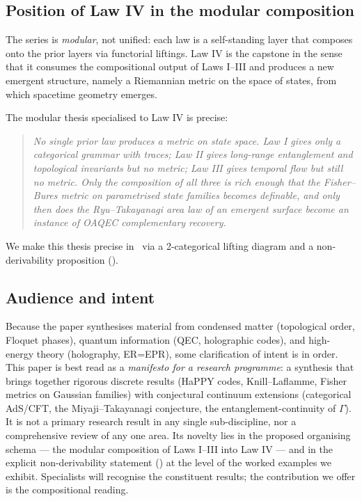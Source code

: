 \documentclass[12pt]{article}
\theoremstyle{definition}
\theoremstyle{remark}
\begin{document}
\subsection{Position of Law IV in the modular composition}
\label{sec:position}

The series is \emph{modular}, not unified: each law is a self-standing layer that composes onto the prior layers via functorial liftings. Law IV is the capstone in the sense that it consumes the compositional output of Laws I--III and produces a new emergent structure, namely a Riemannian metric on the space of states, from which spacetime geometry emerges.

The modular thesis specialised to Law IV is precise:
\begin{quote}
\emph{No single prior law produces a metric on state space. Law I gives only a categorical grammar with traces; Law II gives long-range entanglement and topological invariants but no metric; Law III gives temporal flow but still no metric. Only the composition of all three is rich enough that the Fisher--Bures metric on parametrised state families becomes definable, and only then does the Ryu--Takayanagi area law of an emergent surface become an instance of OAQEC complementary recovery.}
\end{quote}

We make this thesis precise in~ via a 2-categorical lifting diagram and a non-derivability proposition ().

\subsection{Audience and intent}
\label{sec:audience}

Because the paper synthesises material from condensed matter (topological order, Floquet phases), quantum information (QEC, holographic codes), and high-energy theory (holography, ER=EPR), some clarification of intent is in order. This paper is best read as a \emph{manifesto for a research programme}: a synthesis that brings together rigorous discrete results (HaPPY codes, Knill--Laflamme, Fisher metrics on Gaussian families) with conjectural continuum extensions (categorical AdS/CFT, the Miyaji--Takayanagi conjecture, the entanglement-continuity of $\Gamma$). It is not a primary research result in any single sub-discipline, nor a comprehensive review of any one area. Its novelty lies in the proposed organising schema --- the modular composition of Laws I--III into Law IV --- and in the explicit non-derivability statement () at the level of the worked examples we exhibit. Specialists will recognise the constituent results; the contribution we offer is the compositional reading.
\end{document}
